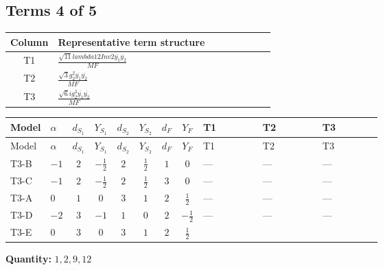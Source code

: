 \documentclass[8pt]{article}
\begin{document}
\begin{landscape}
\subsection*{Terms 4 of 5}
\begin{center}
\begin{tabular}{@{}c >{\raggedright\arraybackslash}p{0.82\linewidth}@{}}
\toprule
Column & Representative term structure \\
\midrule
T1 & \(\displaystyle \frac{\sqrt{11} lambda12Inv2 \overline{y_{1}} \overline{y_{2}}}{MF}\) \\
\midrule
T2 & \(\displaystyle \frac{\sqrt{3} g_{2}^{2} \overline{y_{1}} \overline{y_{2}}}{MF}\) \\
\midrule
T3 & \(\displaystyle \frac{\sqrt{6} i g_{2}^{2} \overline{y_{1}} \overline{y_{2}}}{MF}\) \\
\midrule
\bottomrule
\end{tabular}
\end{center}
\smallskip
\tiny
\begin{longtable}{@{}llcccccc >{\raggedright\arraybackslash}p{0.21\linewidth} >{\raggedright\arraybackslash}p{0.21\linewidth} >{\raggedright\arraybackslash}p{0.21\linewidth}@{}}
\toprule
Model & $\alpha$ & $d_{S_1}$ & $Y_{S_1}$ & $d_{S_2}$ & $Y_{S_2}$ & $d_F$ & $Y_F$ & T1 & T2 & T3 \\
\midrule
\endfirsthead
\toprule
Model & $\alpha$ & $d_{S_1}$ & $Y_{S_1}$ & $d_{S_2}$ & $Y_{S_2}$ & $d_F$ & $Y_F$ & T1 & T2 & T3 \\
\midrule
\endhead
T3-B & $-1$ & $2$ & $-\frac{1}{2}$ & $2$ & $\frac{1}{2}$ & $1$ & $0$ & --- & --- & --- \\
\midrule
T3-C & $-1$ & $2$ & $-\frac{1}{2}$ & $2$ & $\frac{1}{2}$ & $3$ & $0$ & --- & --- & --- \\
\midrule
T3-A & $0$ & $1$ & $0$ & $3$ & $1$ & $2$ & $\frac{1}{2}$ & --- & --- & --- \\
\midrule
T3-D & $-2$ & $3$ & $-1$ & $1$ & $0$ & $2$ & $-\frac{1}{2}$ & --- & --- & --- \\
\midrule
T3-E & $0$ & $3$ & $0$ & $3$ & $1$ & $2$ & $\frac{1}{2}$ & \scriptsize\adjustbox{max width=\linewidth}{$\begin{gathered} \frac{3 \sqrt{11} lambda12Inv2 \overline{y_{1}} \overline{y_{2}}}{22 MF}\end{gathered}$} & \scriptsize\adjustbox{max width=\linewidth}{$\begin{gathered} \frac{15 \sqrt{3} g_{2}^{2} \overline{y_{1}} \overline{y_{2}}}{8 MF}\end{gathered}$} & \scriptsize\adjustbox{max width=\linewidth}{$\begin{gathered} - \frac{\sqrt{6} i g_{2}^{2} \overline{y_{1}} \overline{y_{2}}}{6 MF}\end{gathered}$} \\
\midrule
\bottomrule
\end{longtable}
\clearpage
\noindent\textbf{Quantity: }$\mathrm{1,2,9,12}$\par\smallskip

\end{landscape}
\end{document}
